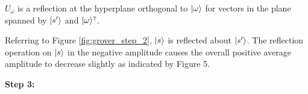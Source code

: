 \documentclass{article}
\begin{document}
\noindent
$U_{{\omega }}$ is a reflection at the hyperplane orthogonal to $\ket{\omega}$  for vectors in the plane spanned by $\ket{s'}$  and $\ket{\omega}$\hyperlink{7}{$^7$}.
\vspace{5mm}

\noindent
Referring to Figure \ref{fig:grover_step_2}, $\ket{s}$ is reflected about $\ket{s'}$. The reflection operation on $\ket{s}$ in the negative amplitude causes the overall positive average amplitude to decrease slightly as indicated by Figure 5. 
\vspace{5mm}

\textbf{Step 3:}
\vspace{5mm}

\begin{figure}[h]

  \begin{tikzpicture}[x=0.75pt,y=0.75pt,yscale=-1,xscale=1]


\end{tikzpicture}
\end{figure}
\end{document}
